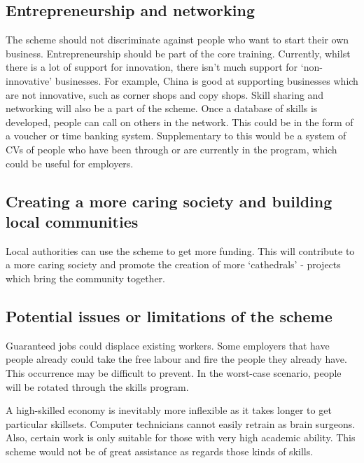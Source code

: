 \documentclass[]{tufte-handout}
\begin{document}
\hypertarget{entrepreneurship-and-networking}{%
\subsection{Entrepreneurship and
networking}\label{entrepreneurship-and-networking}}

The scheme should not discriminate against people who want to start
their own business. Entrepreneurship should be part of the core
training. Currently, whilst there is a lot of support for innovation,
there isn't much support for `non-innovative' businesses. For example,
China is good at supporting businesses which are not innovative, such as
corner shops and copy shops. Skill sharing and networking will also be a
part of the scheme. Once a database of skills is developed, people can
call on others in the network. This could be in the form of a voucher or
time banking system. Supplementary to this would be a system of CVs of
people who have been through or are currently in the program, which
could be useful for employers.

\hypertarget{creating-a-more-caring-society-and-building-local-communities}{%
\subsection{Creating a more caring society and building local
communities}\label{creating-a-more-caring-society-and-building-local-communities}}

Local authorities can use the scheme to get more funding. This will
contribute to a more caring society and promote the creation of more
`cathedrals' - projects which bring the community together.

\hypertarget{potential-issues-or-limitations-of-the-scheme}{%
\subsection{Potential issues or limitations of the
scheme}\label{potential-issues-or-limitations-of-the-scheme}}

Guaranteed jobs could displace existing workers. Some employers that
have people already could take the free labour and fire the people they
already have. This occurrence may be difficult to prevent. In the
worst-case scenario, people will be rotated through the skills program.

A high-skilled economy is inevitably more inflexible as it takes longer
to get particular skillsets. Computer technicians cannot easily retrain
as brain surgeons. Also, certain work is only suitable for those with
very high academic ability. This scheme would not be of great assistance
as regards those kinds of skills.
\end{document}
